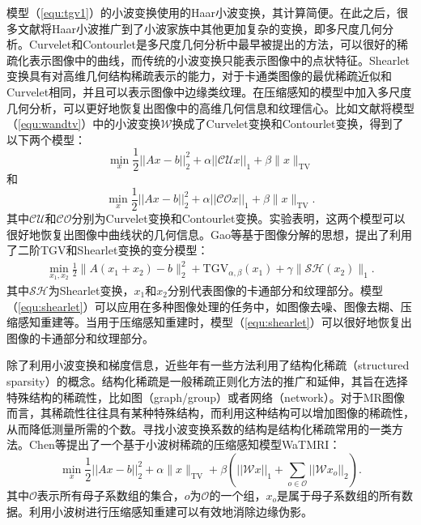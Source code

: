 模型（\ref{equ:tgv1}）的小波变换使用的Haar小波变换\cite{stankovic2003haar}，其计算简便。在此之后，很多文献将Haar小波推广到了小波家族中其他更加复杂的变换，即多尺度几何分析。Curvelet\cite{candes2000curvelets}和Contourlet\cite{do2005contourlet}是多尺度几何分析中最早被提出的方法，可以很好的稀疏化表示图像中的曲线，而传统的小波变换只能表示图像中的点状特征。Shearlet\cite{easley2008sparse}变换具有对高维几何结构稀疏表示的能力，对于卡通类图像的最优稀疏近似和Curvelet相同，并且可以表示图像中边缘类纹理。在压缩感知的模型中加入多尺度几何分析，可以更好地恢复出图像中的高维几何信息和纹理信心。比如文献\cite{qu2010combined,qu2010iterative}将模型（\ref{equ:wandtv}）中的小波变换$\mathcal{W}$换成了Curvelet变换和Contourlet变换，得到了以下两个模型：
\begin{equation}
	\min_x\frac{1}{2}||Ax-b||^2_2+\alpha ||\mathcal{CU}x||_1+\beta \|x\|_\mathrm{TV}
\end{equation}
和
\begin{equation}
	\min_x\frac{1}{2}||Ax-b||^2_2+\alpha ||\mathcal{CO}x||_1+\beta \|x\|_\mathrm{TV}.
\end{equation}
其中$\mathcal{CU}$和$\mathcal{CO}$分别为Curvelet变换和Contourlet变换。实验表明，这两个模型可以很好地恢复出图像中曲线状的几何信息。Gao等\cite{infimaltgv}基于图像分解的思想，提出了利用了二阶TGV和Shearlet变换的变分模型：
\begin{equation}
	\begin{aligned}
		\min_{x_1,x_2}\frac{1}{2}\|A(x_1+x_2)-b\|^2_2+\mathrm{TGV}_{\alpha,\beta}(x_1)+\gamma\|\mathcal{SH}(x_2)\|_1.
	\end{aligned}
	\label{equ:shearlet}
\end{equation}
其中$\mathcal{SH}$为Shearlet变换，$x_1$和$x_2$分别代表图像的卡通部分和纹理部分。模型（\ref{equ:shearlet}）可以应用在多种图像处理的任务中，如图像去噪、图像去糊、压缩感知重建等。当用于压缩感知重建时，模型（\ref{equ:shearlet}）可以很好地恢复出图像的卡通部分和纹理部分。

除了利用小波变换和梯度信息，近些年有一些方法利用了结构化稀疏（structured sparsity）的概念。结构化稀疏是一般稀疏正则化方法的推广和延伸，其旨在选择特殊结构的稀疏性，比如图（graph/group）或者网络（network）。对于MR图像而言，其稀疏性往往具有某种特殊结构，而利用这种结构可以增加图像的稀疏性，从而降低测量所需的个数。寻找小波变换系数的结构是结构化稀疏常用的一类方法。Chen等提出了一个基于小波树稀疏的压缩感知模型WaTMRI\cite{tree,chen2014exploiting}：
\begin{equation}
	\min_x\frac{1}{2}||Ax-b||^2_2+\alpha \|x\|_\mathrm{TV} + \beta (||\mathcal{W}x||_1 + \sum_{o\in \mathscr{O}}||\mathcal{W}x_o||_2).
\end{equation}
其中$\mathscr{O}$表示所有母子系数组的集合，$o$为$\mathscr{O}$的一个组，$x_o$是属于母子系数组的所有数据。利用小波树进行压缩感知重建可以有效地消除边缘伪影。

